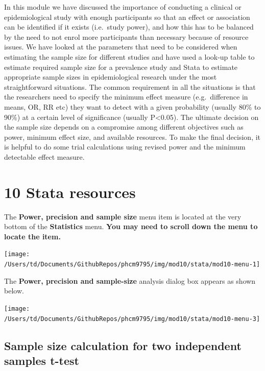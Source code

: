 \documentclass[
]{memoir}
\begin{document}
In this module we have discussed the importance of conducting a clinical or epidemiological study with enough participants so that an effect or association can be identified if it exists (i.e.~study power), and how this has to be balanced by the need to not enrol more participants than necessary because of resource issues. We have looked at the parameters that need to be considered when estimating the sample size for different studies and have used a look-up table to estimate required sample size for a prevalence study and Stata to estimate appropriate sample sizes in epidemiological research under the most straightforward situations. The common requirement in all the situations is that the researchers need to specify the minimum effect measure (e.g.~difference in means, OR, RR etc) they want to detect with a given probability (usually 80\% to 90\%) at a certain level of significance (usually P\textless0.05). The ultimate decision on the sample size depends on a compromise among different objectives such as power, minimum effect size, and available resources. To make the final decision, it is helpful to do some trial calculations using revised power and the minimum detectable effect measure.

\hypertarget{stata-resources-2}{%
\chapter*{\texorpdfstring{\textbf{10} Stata resources}{10 Stata resources}}\label{stata-resources-2}}

The \textbf{Power, precision and sample size} menu item is located at the very bottom of the \textbf{Statistics} menu. \textbf{You may need to scroll down the menu to locate the item.}

\texttt{[image: /Users/td/Documents/GithubRepos/phcm9795/img/mod10/stata/mod10-menu-1]}

The \textbf{Power, precision and sample-size} analysis dialog box appears as shown below.

\texttt{[image: /Users/td/Documents/GithubRepos/phcm9795/img/mod10/stata/mod10-menu-3]}

\hypertarget{sample-size-calculation-for-two-independent-samples-t-test}{%
\section{Sample size calculation for two independent samples t-test}\label{sample-size-calculation-for-two-independent-samples-t-test}}
\end{document}
